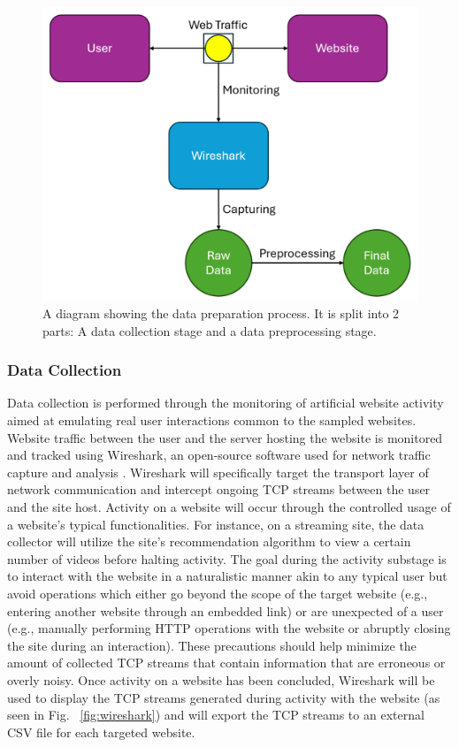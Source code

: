 \documentclass[10pt,sigconf,letterpaper,nonacm]{acmart}
\begin{document}
\begin{figure}[h]
  \centering
  \includegraphics[width=\linewidth]{img/data_process.png}
  \caption{A diagram showing the data preparation process. It is split into 2 parts: A data collection stage and a data preprocessing stage.}
  \label{fig:dataprep}
\end{figure}

\subsubsection{Data Collection}
Data collection is performed through the monitoring of artificial website activity aimed at emulating real user interactions common to the sampled websites.
Website traffic between the user and the server hosting the website is monitored and tracked using Wireshark, an open-source software used for network traffic capture and analysis \cite{wireshark}.
Wireshark will specifically target the transport layer of network communication and intercept ongoing TCP streams between the user and the site host.
Activity on a website will occur through the controlled usage of a website's typical functionalities.
For instance, on a streaming site, the data collector will utilize the site's recommendation algorithm to view a certain number of videos before halting activity.
The goal during the activity substage is to interact with the website in a naturalistic manner akin to any typical user but avoid operations which either go beyond the scope of the target website (e.g., entering another website through an embedded link) or are unexpected of a user (e.g., manually performing HTTP operations with the website or abruptly closing the site during an interaction).
These precautions should help minimize the amount of collected TCP streams that contain information that are erroneous or overly noisy.
Once activity on a website has been concluded, Wireshark will be used to display the TCP streams generated during activity with the website (as seen in Fig. ~\ref{fig:wireshark}) and will export the TCP streams to an external CSV file for each targeted website.
\end{document}
